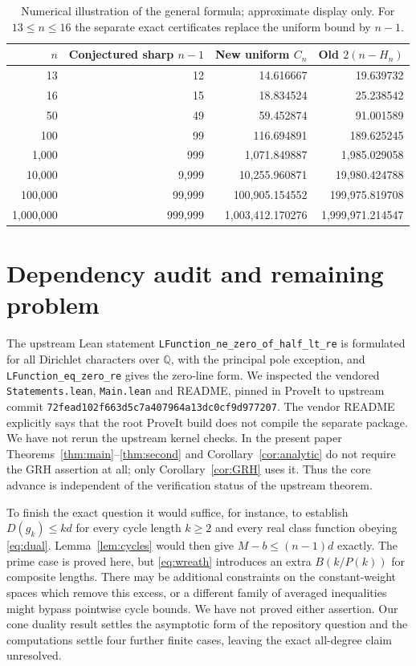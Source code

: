 \documentclass[11pt]{article}
\theoremstyle{remark}
\newcommand{\Q}{\mathbb Q}
\begin{document}
\begin{table}[ht]
\centering\small
\begin{tabular}{rrrr}\toprule
$n$&Conjectured sharp $n-1$&New uniform $C_n$&Old $2(n-H_n)$\\\midrule
13&12&14.616667&19.639732\\
16&15&18.834524&25.238542\\
50&49&59.452874&91.001589\\
100&99&116.694891&189.625245\\
1,000&999&1,071.849887&1,985.029058\\
10,000&9,999&10,255.960871&19,980.424788\\
100,000&99,999&100,905.154552&199,975.819708\\
1,000,000&999,999&1,003,412.170276&1,999,971.214547\\\bottomrule
\end{tabular}
\caption{Numerical illustration of the general formula; approximate display only. For $13\le n\le16$ the separate exact certificates replace the uniform bound by $n-1$.}
\end{table}

\section{Dependency audit and remaining problem}
The upstream Lean statement \texttt{LFunction\_ne\_zero\_of\_half\_lt\_re} is formulated for all Dirichlet characters over $\Q$, with the principal pole exception, and \texttt{LFunction\_eq\_zero\_re} gives the zero-line form. We inspected the vendored \texttt{Statements.lean}, \texttt{Main.lean} and README, pinned in ProveIt to upstream commit \texttt{72fead102f663d5c7a407964a13dc0cf9d977207}. The vendor README explicitly says that the root ProveIt build does not compile the separate package. We have not rerun the upstream kernel checks. In the present paper Theorems~\ref{thm:main}--\ref{thm:second} and Corollary~\ref{cor:analytic} do not require the GRH assertion at all; only Corollary~\ref{cor:GRH} uses it. Thus the core advance is independent of the verification status of the upstream theorem.

To finish the exact question it would suffice, for instance, to establish $D(g_k)\le k d$ for every cycle length $k\ge2$ and every real class function obeying \eqref{eq:dual}. Lemma~\ref{lem:cycles} would then give $M-b\le(n-1)d$ exactly. The prime case is proved here, but \eqref{eq:wreath} introduces an extra $B(k/P(k))$ for composite lengths. There may be additional constraints on the constant-weight spaces which remove this excess, or a different family of averaged inequalities might bypass pointwise cycle bounds. We have not proved either assertion. Our cone duality result settles the asymptotic form of the repository question and the computations settle four further finite cases, leaving the exact all-degree claim unresolved.
\end{document}
